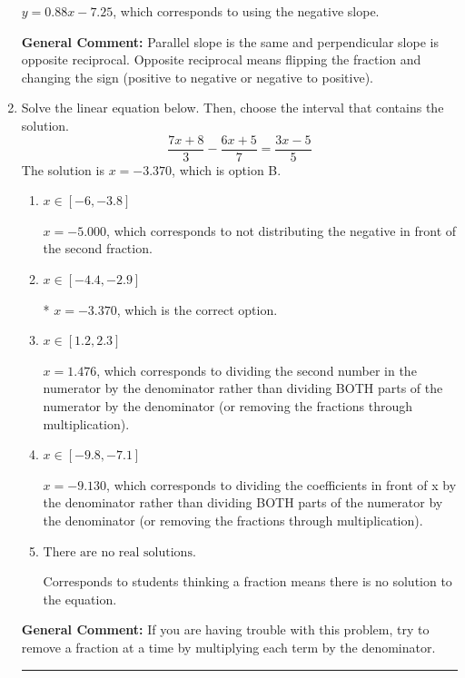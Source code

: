 \documentclass{extbook}[14pt]
\newcommand{\litem}[1]{\item #1

\rule{\textwidth}{0.4pt}}
\begin{document}
\begin{enumerate}
{\begin{enumerate}[label=\Alph*.]
 $y = 0.88x - 7.25$, which corresponds to using the negative slope.
\end{enumerate}

\textbf{General Comment:} Parallel slope is the same and perpendicular slope is opposite reciprocal. Opposite reciprocal means flipping the fraction and changing the sign (positive to negative or negative to positive).
}
\litem{
Solve the linear equation below. Then, choose the interval that contains the solution.
\[ \frac{7x + 8}{3} - \frac{6x + 5}{7} = \frac{3x -5}{5} \]The solution is \( x = -3.370 \), which is option B.\begin{enumerate}[label=\Alph*.]
\item \( x \in [-6, -3.8] \)

 $x = -5.000$, which corresponds to not distributing the negative in front of the second fraction.
\item \( x \in [-4.4, -2.9] \)

* $x = -3.370$, which is the correct option.
\item \( x \in [1.2, 2.3] \)

 $x = 1.476$, which corresponds to dividing the second number in the numerator by the denominator rather than dividing BOTH parts of the numerator by the denominator (or removing the fractions through multiplication).
\item \( x \in [-9.8, -7.1] \)

 $x = -9.130$, which corresponds to dividing the coefficients in front of x by the denominator rather than dividing BOTH parts of the numerator by the denominator (or removing the fractions through multiplication).
\item \( \text{There are no real solutions.} \)

Corresponds to students thinking a fraction means there is no solution to the equation.
\end{enumerate}

\textbf{General Comment:} If you are having trouble with this problem, try to remove a fraction at a time by multiplying each term by the denominator.
}
\end{enumerate}
\end{document}
